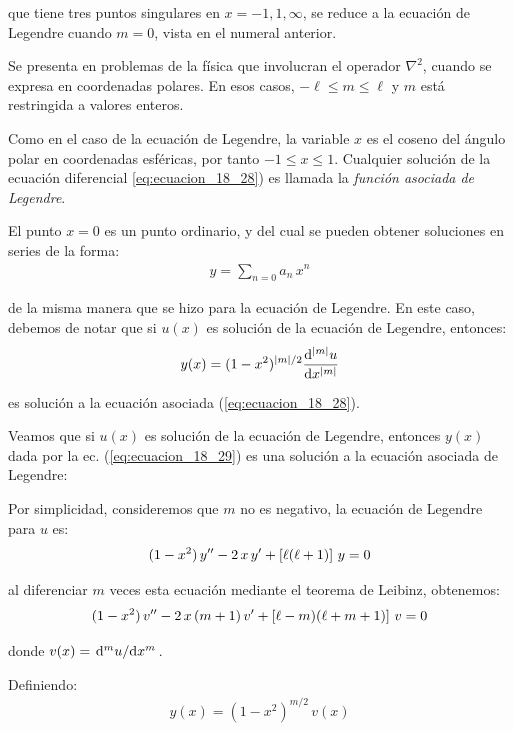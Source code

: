 que tiene tres puntos singulares en $x = -1, 1, \infty$, se reduce a la ecuación de Legendre cuando $m=0$, vista en el numeral anterior.
\par
Se presenta en problemas de la física que involucran el operador $\nabla^{2}$, cuando se expresa en coordenadas polares. En esos casos, $- \ell \leq m \leq \ell$ y $m$ está restringida a valores enteros.
\par
Como en el caso de la ecuación de Legendre, la variable $x$ es el coseno del ángulo polar en coordenadas esféricas, por tanto $-1 \leq x \leq 1$. Cualquier solución de la ecuación diferencial \ref{eq:ecuacion_18_28}) es llamada la \emph{función asociada de Legendre}.
\par
El punto $x = 0$ es un punto ordinario, y del cual se pueden obtener soluciones en series de la forma:
\begin{align*}
y = \sum_{n=0} a_{n} \, x^{n}
\end{align*}

de la misma manera que se hizo para la ecuación de Legendre. En este caso, debemos de notar que si $u(x)$ es solución de la ecuación de Legendre, entonces:
\begin{align}
y(x) = (1 -x^{2})^{\abs{m}/2} \dv[\abs{m}]{u}{x}
\label{eq:ecuacion_18_29}
\end{align}

es solución a la ecuación asociada (\ref{eq:ecuacion_18_28}).
\par
Veamos que si $u(x)$ es solución de la ecuación de Legendre, entonces $y(x)$ dada por la ec. (\ref{eq:ecuacion_18_29}) es una solución a la ecuación asociada de Legendre:
\par
Por simplicidad, consideremos que $m$ no es negativo, la ecuación de Legendre para $u$ es:
\begin{align*}
(1 - x^{2}) \, {y}^{\prime \prime} - 2 \, x \, {y}^{\prime} + \left[ \ell (\ell + 1) \right] \, y = 0
\end{align*}

al diferenciar $m$ veces esta ecuación mediante el teorema de Leibinz, obtenemos:
\begin{align}
(1 - x^{2}) \, {v}^{\prime \prime} - 2 \, x \, (m + 1) \, {v}^{\prime} + \left[ \ell - m) (\ell + m + 1) \right] \, v = 0
\label{eq:ecuacion_18_30}
\end{align}

donde $v(x) = \dv*[m]{u}{x}$.
\par
Definiendo:
\begin{align*}
y(x) = (1 - x^{2}) ^{m/2} \, v(x)
\end{align*}

